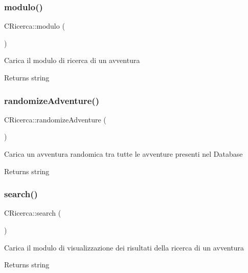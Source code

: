 \subsubsection{\texorpdfstring{modulo()}{modulo()}}
{\footnotesize\ttfamily C\+Ricerca\+::modulo (\begin{DoxyParamCaption}{ }\end{DoxyParamCaption})}

Carica il modulo di ricerca di un avventura

\begin{DoxyReturn}{Returns}
string 
\end{DoxyReturn}
\mbox{\label{class_c_ricerca_a33fcd2d514cb41fbffcdc8bdd97c6176}} 
\subsubsection{\texorpdfstring{randomize\+Adventure()}{randomizeAdventure()}}
{\footnotesize\ttfamily C\+Ricerca\+::randomize\+Adventure (\begin{DoxyParamCaption}{ }\end{DoxyParamCaption})}

Carica un avventura randomica tra tutte le avventure presenti nel Database

\begin{DoxyReturn}{Returns}
string 
\end{DoxyReturn}
\mbox{\label{class_c_ricerca_ad9db48dfeb34933bf9d12c911d2b34a4}} 
\subsubsection{\texorpdfstring{search()}{search()}}
{\footnotesize\ttfamily C\+Ricerca\+::search (\begin{DoxyParamCaption}{ }\end{DoxyParamCaption})}

Carica il modulo di visualizzazione dei risultati della ricerca di un avventura

\begin{DoxyReturn}{Returns}
string 
\end{DoxyReturn}
\mbox{\label{class_c_ricerca_a86b16017d05539bb20445d2bcff3b16a}} 
